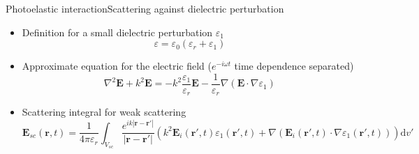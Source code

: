 \documentclass[11pt]{beamer}
\begin{document}
		
	\begin{frame}{Photoelastic interaction}{Scattering against dielectric perturbation}
		\pause
		\begin{itemize}
			\item Definition for a small dielectric perturbation $\varepsilon_1$
			\begin{equation*}
				\varepsilon = \varepsilon_0(\varepsilon_r + \varepsilon_1)
			\end{equation*}
			\pause
			\item Approximate equation for the electric field ($e^{-i\omega t}$ time dependence separated)
			\begin{equation*}
				\nabla^2\bm{E} + k^2 \bm{E} =
				-k^2 \frac{\varepsilon_1}{\varepsilon_r} \bm{E} -\frac{1}{\varepsilon_r}\nabla(\bm{E} \cdot \nabla \varepsilon_1)
			\end{equation*}
			\pause
			\item Scattering integral for weak scattering
			{\footnotesize \begin{equation*}
				\bm{E}_{sc}(\bm{r},t) = \frac{1}{4\pi\varepsilon_r} \int_{V_{sc}} \frac{e^{ik |\bm{r}-\bm{r'}| }}{ |\bm{r}-\bm{r'}|} \left( k^2 \bm{E}_i (\bm{r'},t) \varepsilon_1 (\bm{r'},t) + \nabla (\bm{E}_i (\bm{r'},t) \cdot \nabla \varepsilon_1 (\bm{r'},t)) \right) \mathrm{d}v'
			\end{equation*}}
		\end{itemize}
	\end{frame}
	
\end{document}

